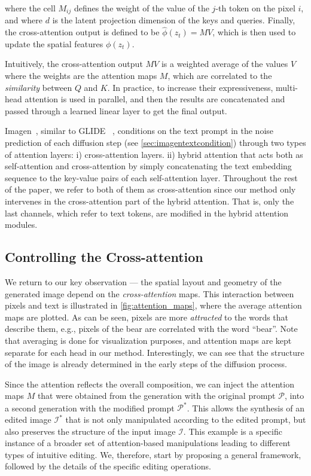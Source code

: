 where the cell $M_{ij}$ defines the weight of the value of the $j$-th token on the pixel $i$, and where $d$ is the latent projection dimension of the keys and queries. Finally, the cross-attention output is defined to be $\widehat{\phi}\left(z_t\right)=MV$, which is then used to update the spatial features $\phi(z_t)$.

Intuitively, the cross-attention output $MV$ is a weighted average of the values $V$ where the weights are the attention maps $M$, which are correlated to the \textit{similarity} between $Q$ and $K$. In practice, to increase their expressiveness, multi-head attention \cite{NIPS2017_3f5ee243} is used in parallel, and then the results are concatenated and passed through a learned linear layer to get the final output.

Imagen~\cite{saharia2022photorealistic}, similar to GLIDE ~\cite{nichol2021glide}, conditions on the text prompt in the noise prediction of each diffusion step (see \ref{sec:imagentextcondition}) through two types of attention layers: i) cross-attention layers. ii) hybrid attention that acts both as self-attention and cross-attention by simply concatenating the text embedding sequence to the key-value pairs of each self-attention layer. Throughout the rest of the paper, we refer to both of them as cross-attention since our method only intervenes in the cross-attention part of the hybrid attention. That is, only the last channels, which refer to text tokens, are modified in the hybrid attention modules.

\subsection{Controlling the Cross-attention}\label{sec:controlcrossattention}

We return to our key observation ---  the spatial layout and geometry of the generated image depend on the \emph{cross-attention} maps. This interaction between pixels and text is illustrated in \ref{fig:attention_maps}, where the average attention maps are plotted. As can be seen, pixels are more \textit{attracted} to the words that describe them, e.g., pixels of the bear are correlated with the word ``bear''. Note that averaging is done for visualization purposes, and attention maps are kept separate for each head in our method. Interestingly, we can see that the structure of the image is already determined in the early steps of the diffusion process. 

Since the attention reflects the overall composition, we can inject the attention maps $M$ that were obtained from the generation with the original prompt $\mathcal{P}$, into a second generation with the modified prompt $\mathcal{P}^*$. This allows the synthesis of an edited image $\mathcal{I}^*$ that is not only manipulated according to the edited prompt, but also preserves the structure of the input image $\mathcal{I}$. This example is a specific instance of a broader set of attention-based manipulations leading to different types of intuitive editing. We, therefore, start by proposing a general framework, followed by the details of the specific editing operations. 

